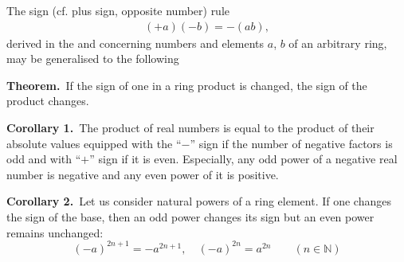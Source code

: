 \documentclass[12pt]{article}
\theoremstyle{definition}
\begin{document}
   
 

The sign (cf. plus sign, opposite number) rule
\begin{align}
(+a)(-b) = -(ab),
\end{align}
derived in the 
and concerning numbers and elements $a$, $b$ of an arbitrary 
ring, may be generalised to the following

\textbf{Theorem.}\, If the sign of one  in a ring product is changed, the sign of the product changes.

\textbf{Corollary 1.}\, The product of real numbers is equal to the product of their absolute values equipped with the ``$-$'' sign if the number of negative factors is odd and with ``$+$'' sign if it is even.  Especially, any odd power of a negative real number is negative and any even power of it is positive.

\textbf{Corollary 2.}\, Let us consider natural powers of a ring element.  If one changes the sign of the base, then an odd power changes its sign but an even power remains unchanged:
$$(-a)^{2n+1} = -a^{2n+1}, \quad (-a)^{2n} = a^{2n} \qquad (n \in \mathbb{N})$$

\end{document}
